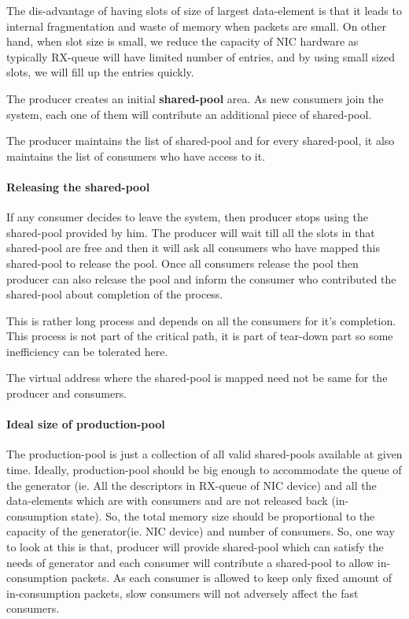 \documentclass[a4paper,twoside]{report} %
\begin{document}
The dis-advantage of having slots of size of largest data-element
is that it leads to internal fragmentation and waste of memory 
when packets are small.  On other hand, when slot size is small,
we reduce the capacity of NIC hardware as typically RX-queue
will have limited number of entries, and by using small sized
slots, we will fill up the entries quickly.


The producer creates an initial \textbf{shared-pool} area.  As new
consumers join the system, each one of them will contribute an
additional piece of shared-pool.


The producer maintains the list of shared-pool and for every
shared-pool, it also maintains the list of consumers who have access
to it.  

\paragraph{Releasing the shared-pool}
If any consumer decides to leave the system, then producer
stops using the shared-pool provided by him.  The producer will 
wait till all the slots in that shared-pool are free and then it will
ask all consumers who have mapped this shared-pool to release the
pool.  Once all consumers release the pool then producer can also
release the pool and inform the consumer who contributed the
shared-pool about completion of the process.

This is rather long process and depends on all the consumers for it's
completion.  This process is not part of the critical path, it is part
of tear-down part so some inefficiency can be tolerated here.


The virtual address where the shared-pool is mapped need not be same for 
the producer and consumers.


\paragraph{Ideal size of production-pool}
The production-pool is just a collection of all valid shared-pools
available at given time.  Ideally, production-pool should be big enough 
to accommodate the queue of the generator (ie. All the descriptors 
in RX-queue of NIC device) and all the data-elements which are with 
consumers and are not released back (in-consumption state).  
So, the total memory size should be proportional to the capacity of 
the generator(ie. NIC device) and number of consumers.  
So, one way to look at this is that, producer will provide shared-pool
which can satisfy the needs of generator and each consumer will
contribute a shared-pool to allow in-consumption packets.
As each consumer is allowed to keep only fixed amount of 
in-consumption packets, slow consumers will not adversely 
affect the fast consumers.
\end{document}
